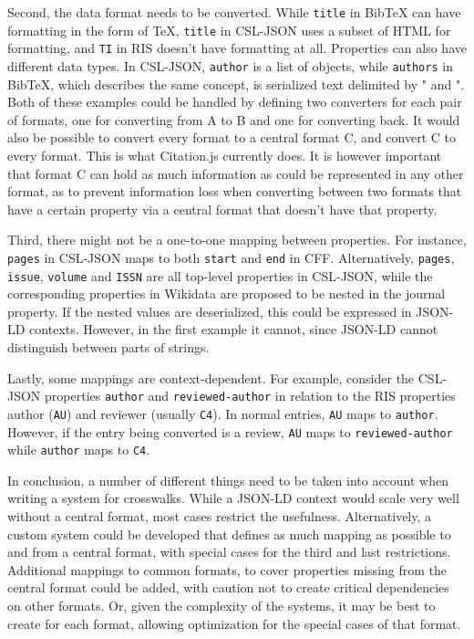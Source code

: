 \documentclass[fleqn,10pt,lineno]{wlpeerj} %
\begin{document}
Second, the data format needs to be converted. While \texttt{title} in BibTeX can have formatting in the form of \TeX, \texttt{title} in CSL-JSON uses a subset of HTML for formatting, and \texttt{TI} in RIS doesn't have formatting at all. Properties can also have different data types. In CSL-JSON, \texttt{author} is a list of objects, while \texttt{authors} in BibTeX, which describes the same concept, is serialized text delimited by " and ". Both of these examples could be handled by defining two converters for each pair of formats, one for converting from A to B and one for converting back. It would also be possible to convert every format to a central format C, and convert C to every format. This is what Citation.js currently does. It is however important that format C can hold as much information as could be represented in any other format, as to prevent information loss when converting between two formats that have a certain property via a central format that doesn't have that property.

Third, there might not be a one-to-one mapping between properties. For instance, \texttt{pages} in CSL-JSON maps to both \texttt{start} and \texttt{end} in CFF. Alternatively, \texttt{pages}, \texttt{issue}, \texttt{volume} and \texttt{ISSN} are all top-level properties in CSL-JSON, while the corresponding properties in Wikidata are proposed to be nested in the journal property. If the nested values are deserialized, this could be expressed in JSON-LD contexts. However, in the first example it cannot, since JSON-LD cannot distinguish between parts of strings.

Lastly, some mappings are context-dependent. For example, consider the CSL-JSON properties \texttt{author} and \texttt{reviewed-author} in relation to the RIS properties author (\texttt{AU}) and reviewer (usually \texttt{C4}). In normal entries, \texttt{AU} maps to \texttt{author}. However, if the entry being converted is a review, \texttt{AU} maps to \texttt{reviewed-author} while \texttt{author} maps to \texttt{C4}.

In conclusion, a number of different things need to be taken into account when writing a system for crosswalks. While a JSON-LD context would scale very well without a central format, most cases restrict the usefulness. Alternatively, a custom system could be developed that defines as much mapping as possible to and from a central format, with special cases for the third and last restrictions. Additional mappings to common formats, to cover properties missing from the central format could be added, with caution not to create critical dependencies on other formats. Or, given the complexity of the systems, it may be best to create for each format, allowing optimization for the special cases of that format.
\end{document}
